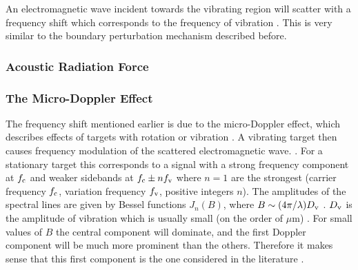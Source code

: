 \documentclass[11pt,twoside]{eitExjobb}
\begin{document}
	An electromagnetic wave incident towards the vibrating region will scatter with a frequency shift which corresponds to the frequency of vibration \cite{Top2014}. This is very similar to the boundary perturbation mechanism described before.
	
	\subsubsection{Acoustic Radiation Force}
	
	\subsubsection{The Micro-Doppler Effect}
	The frequency shift mentioned earlier is due to the micro-Doppler effect, which describes effects of targets with rotation or vibration \cite{Buerkle2007}. A vibrating target then causes frequency modulation of the scattered electromagnetic wave. \cite{Chen2006}. For a stationary target this corresponds to a signal with a strong frequency component at $f_{\mathrm{c}}$ and weaker sidebands at $f_{\mathrm{c}} \pm n f_{\mathrm{v}}$ where $n=1$ are the strongest (carrier frequency $f_{\mathrm{c}}$, variation frequency $f_{\mathrm{v}}$, positive integers $n$). The amplitudes of the spectral lines are given by Bessel functions $J_n(B)$, where $B \sim (4\pi/\lambda)D_{\mathrm{v}}$ \cite{Chen2006}. $D_{\mathrm{v}}$ is the amplitude of vibration which is usually small (on the order of $\mu$m) \cite{Buerkle2007}\cite{Top2014}. For small values of $B$ the central component will dominate, and the first Doppler component will be much more prominent than the others. Therefore it makes sense that this first component is the one considered in the literature \cite{Buerkle2007}.
	
	
\end{document}
